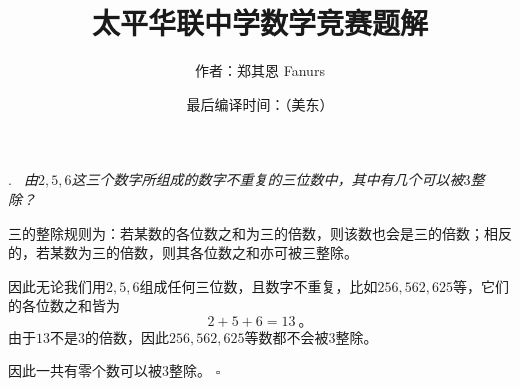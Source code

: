 \documentclass[a4,12pt]{article}
\newcounter{Problem}
\newcommand{\Problem}[2]{
		\vspace*{10pt}
		\label{Problem #1}
		\noindent#1.\emph{~#2}
	}
\newcommand{\Qed}{\hfill\ensuremath{\square}}
\begin{document}
	\title{
		\vspace*{-50pt}
		\Large{\textbf{太平华联中学数学竞赛题解}\vspace*{-10pt}}\\
	}
	\author{作者：郑其恩 Fanurs\vspace*{-30pt}}
	\date{最后编译时间：\DTMnow （美东）}
	\maketitle
	\vspace*{-25pt}

\Problem{6}{
	由$2, 5, 6$这三个数字所组成的数字不重复的三位数中，其中有几个可以被$3$整除？
	}

	三的整除规则为：若某数的各位数之和为三的倍数，则该数也会是三的倍数；相反的，若某数为三的倍数，则其各位数之和亦可被三整除。

	因此无论我们用$2, 5, 6$组成任何三位数，且数字不重复，比如$256, 562, 625$等，它们的各位数之和皆为
	\[ 2+5+6 = 13 \ \mbox{。} \]
	由于$13$不是$3$的倍数，因此$256, 562, 625$等数都不会被$3$整除。

	因此一共有零个数可以被$3$整除。
	\Qed
	\vspace*{30pt}
\end{document}
